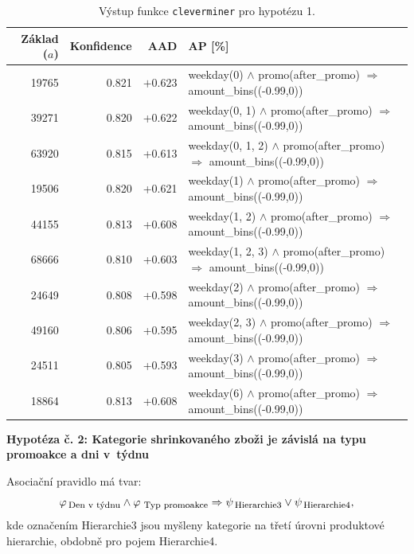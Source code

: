     \begin{table}[h!]
        \begin{center}
                \captionsetup{justification=centering}
        \caption{Výstup funkce \texttt{cleverminer} pro hypotézu 1.}
        \begin{tabular}{rrrp{7.5cm}}
            Základ ($a$) & Konfidence & AAD & AP [\%]\\
            \midrule
19765 & 0.821 & $+0.623$ & weekday(0) $\land$ promo(after\_promo) $\Rightarrow$ amount\_bins((-0.99,0)) \\
39271 & 0.820 & +0.622 & weekday(0, 1)  $\land$ promo(after\_promo) $\Rightarrow$ amount\_bins((-0.99,0)) \\
63920 & 0.815 & +0.613 & weekday(0, 1, 2)  $\land$ promo(after\_promo) $\Rightarrow$ amount\_bins((-0.99,0)) \\
19506 & 0.820 & +0.621 & weekday(1)  $\land$ promo(after\_promo) $\Rightarrow$ amount\_bins((-0.99,0)) \\
44155 & 0.813 & +0.608 & weekday(1, 2)  $\land$ promo(after\_promo) $\Rightarrow$ amount\_bins((-0.99,0)) \\
68666 & 0.810 & +0.603 & weekday(1, 2, 3)  $\land$ promo(after\_promo) $\Rightarrow$ amount\_bins((-0.99,0)) \\
24649 & 0.808 & +0.598 & weekday(2)  $\land$ promo(after\_promo) $\Rightarrow$ amount\_bins((-0.99,0)) \\
49160 & 0.806 & +0.595 & weekday(2, 3)  $\land$ promo(after\_promo) $\Rightarrow$ amount\_bins((-0.99,0)) \\
24511 & 0.805 & +0.593 &weekday(3) $\land$ promo(after\_promo) $\Rightarrow$ amount\_bins((-0.99,0)) \\
18864 & 0.813 & +0.608 &weekday(6)  $\land$ promo(after\_promo) $\Rightarrow$ amount\_bins((-0.99,0)) \\
    \end{tabular}
\label{tab:H1vysl}
\end{center}
\end{table}

\vspace*{1em}

\textbf{Hypotéza č. 2: Kategorie shrinkovaného zboži je závislá na typu promoakce a dni v~týdnu}

Asociační pravidlo má tvar:
\begin{equation}
    \varphi_{\mbox{\,\footnotesize Den v~týdnu}} \land \varphi_{\,\mbox{\,\footnotesize Typ promoakce}} \Rightarrow \psi_{\mbox{\,\footnotesize Hierarchie3}} \lor \psi_{\mbox{\,\footnotesize Hierarchie4}},
\end{equation}
kde označením Hierarchie3 jsou myšleny kategorie na třetí úrovni produktové hierarchie, obdobně pro pojem Hierarchie4.

